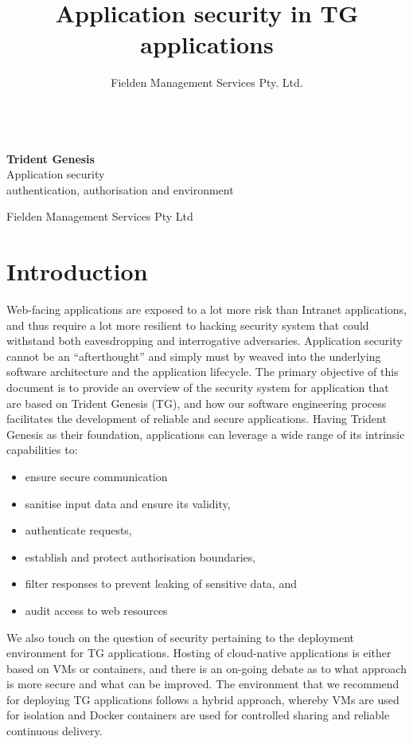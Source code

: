 \documentclass[a4paper,12pt,oneside,openright]{memoir}
\title{Application security in TG applications}
\author{Fielden Management Services Pty. Ltd.}
\date{}
\newcommand*{\titleTH}{\begingroup%
\raggedleft
\vspace*{\baselineskip}
{\Large ~}\\[0.167\textheight]
{\bfseries Trident Genesis}\\[\baselineskip]
{\textcolor{basiccolor}{\Huge Application security}}\\[\baselineskip]
{\small authentication, authorisation and environment}\par
\vfill
{\Large Fielden Management Services Pty Ltd}\par
\endgroup}
\begin{document}
\titleTH
\thispagestyle{empty}
\clearpage
{}


\onehalfspacing

\section*{Introduction}
	Web-facing applications are exposed to a lot more risk than Intranet applications, and thus require a lot more resilient to hacking security system that could withstand both eavesdropping and interrogative adversaries.
	Application security cannot be an ``afterthought'' and simply must by weaved into the underlying software architecture and the application lifecycle.
	The primary objective of this document is to provide an overview of the security system for application that are based on Trident Genesis (TG), and how our software engineering process facilitates the development of reliable and secure applications.
	Having Trident Genesis as their foundation, applications can leverage a wide range of its intrinsic capabilities to:

	\begin{itemize}
	\item ensure secure communication
	\item sanitise input data and ensure its validity,
	\item authenticate requests,
	\item establish and protect authorisation boundaries,
	\item filter responses to prevent leaking of sensitive data, and
	\item audit access to web resources
	\end{itemize}

	We also touch on the question of security pertaining to the deployment environment for TG applications.
	Hosting of cloud-native applications is either based on VMs or containers, and there is an on-going debate as to what approach is more secure and what can be improved.
	The environment that we recommend for deploying TG applications follows a hybrid approach, whereby VMs are used for isolation and Docker containers are used for controlled sharing and reliable continuous delivery.
\end{document}
